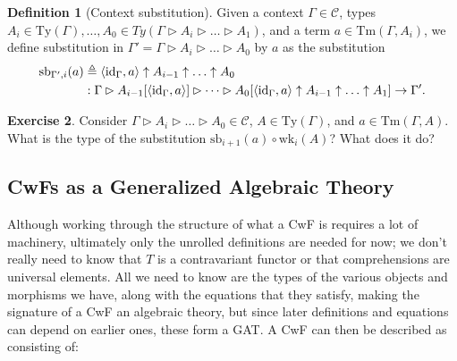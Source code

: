 \documentclass{article}
\renewcommand{\_}{\textrm{\textscale{.5}{\textunderscore}}}
\DeclarePairedDelimiter{\ctxt}{\langle}{\rangle}
\newcommand{\Tm}{\mathrm{Tm}}
\newcommand{\Ty}{\mathrm{Ty}}
\newcommand{\id}{\mathrm{id}}
\newcommand{\wk}{\mathrm{wk}}
\renewcommand{\sb}{\mathrm{sb}}
\theoremstyle{definition}
\newtheorem{definition}{Definition}[section]
\newtheorem{exercise}[definition]{Exercise}
\theoremstyle{plain}
\begin{document}
\begin{definition}[Context substitution]
Given a context $\Gamma \in \mathcal{C}$, types $A_i \in \Ty(\Gamma), \dots, A_0 \in Ty(\Gamma \rhd A_i \rhd \dots \rhd A_1)$,
and a term $a \in \Tm(\Gamma, A_i)$, we define substitution in $\Gamma' = \Gamma \rhd A_i \rhd \dots \rhd A_0$
by $a$ as the substitution
\begin{align*}
    \sb_{\Gamma', i}(a) &\triangleq \ctxt{\id_{\Gamma}, a} \uparrow A_{i-1} \uparrow \dots \uparrow A_0 \\
    &: \Gamma \rhd A_{i-1}[\ctxt{\id_{\Gamma}, a}] \rhd \dots \rhd A_0[\ctxt{\id_{\Gamma}, a} \uparrow A_{i-1} \uparrow \dots \uparrow A_1]
    \to \Gamma'.
\end{align*}
\end{definition}

\begin{exercise}
Consider $\Gamma \rhd A_i \rhd \dots \rhd A_0 \in \mathcal{C}$, $A \in \Ty(\Gamma)$, and $a \in \Tm(\Gamma, A)$.
What is the type of the substitution $\sb_{i+1}(a) \circ \wk_i(A)$?
What does it do?
\end{exercise}

\subsection{CwFs as a Generalized Algebraic Theory} \label{sec:cwf-gat}

Although working through the structure of what a CwF is requires a lot of machinery,
ultimately only the unrolled definitions are needed for now;
we don't really need to know that $T$ is a contravariant functor or that comprehensions are universal elements.
All we need to know are the types of the various objects and morphisms we have,
along with the equations that they satisfy,
making the signature of a CwF an algebraic theory,
but since later definitions and equations can depend on earlier ones, these form a GAT.
A CwF can then be described as consisting of:
\end{document}
